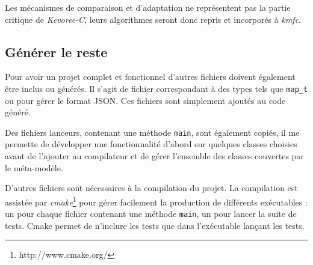 Les mécanismes de comparaison et d'adaptation ne représentent pas la partie critique de \emph{Kevoree-C}, leurs algorithmes seront donc repris et incorporés à \emph{kmfc}.

\subsection{Générer le reste}

Pour avoir un projet complet et fonctionnel d'autres fichiers doivent également être inclus ou générés. Il s'agit de fichier correspondant à des types tels que \texttt{map\_t} ou pour gérer le format JSON. Ces fichiers sont simplement ajoutés au code généré.

Des fichiers lanceurs, contenant une méthode \texttt{main}, sont également copiés, il me permette de développer une fonctionnalité d'abord sur quelques classes choisies avant de l'ajouter au compilateur et de gérer l'ensemble des classes couvertes par le méta-modèle.

D'autres fichiers sont nécessaires à la compilation du projet. La compilation est assistée par \emph{cmake}\footnote{http://www.cmake.org/} pour gérer facilement la production de différents exécutables : un pour chaque fichier contenant une méthode \texttt{main}, un pour lancer la suite de tests. Cmake permet de n'inclure les tests que dans l'exécutable lançant les tests.